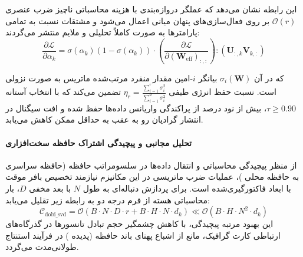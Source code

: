 این رابطه نشان می‌دهد که عملگر دروازه‌بندی با هزینه محاسباتی ناچیز ضرب عنصری $\mathcal{O}(r)$ بر روی فعال‌سازی‌های پنهان میانی اعمال می‌شود و مشتقات نسبت به تمامی پارامترها به صورت کاملاً تحلیلی و ملایم منتشر می‌گردند:
\begin{equation}
\frac{\partial \mathcal{L}}{\partial \alpha_k} = \sigma(\alpha_k)(1 - \sigma(\alpha_k)) \cdot \left( \frac{\partial \mathcal{L}}{\partial (\mathbf{W}_{\text{eff}})_{:, :}} \right) : (\mathbf{U}_{:, k} \mathbf{V}_{k, :})
\end{equation}

که در آن $\sigma_i(\mathbf{W})$ بیانگر $i$-امین مقدار منفرد مرتب‌شده ماتریس به صورت نزولی است. نسبت حفظ انرژی طیفی $\eta_r = \frac{\sum_{i=1}^r \sigma_i^2}{\sum_{i=1}^{d} \sigma_i^2}$ تضمین می‌کند که با انتخاب آستانه $\tau \ge 0.90$، بیش از نود درصد از پراکندگی واریانس داده‌ها حفظ شده و افت سیگنال در انتشار گرادیان رو به عقب به حداقل ممکن کاهش می‌یابد.

\paragraph{تحلیل مجانبی و پیچیدگی اشتراک حافظه سخت‌افزاری}
از منظر پیچیدگی محاسباتی و انتقال داده‌ها در سلسومراتب حافظه (حافظه سراسری  به حافظه محلی )، عملیات ضرب ماتریسی در این مکانیزم نیازمند تخصیص بافر موقت با ابعاد فاکتورگیری‌شده است. برای پردازش دنباله‌ای به طول $N$ با بعد مخفی $D$، بار محاسباتی هسته از فرم درجه دو به رابطه زیر تقلیل می‌یابد:
\begin{equation}
\label{eq:complexity_dobi_svd}
\mathcal{C}_{\text{dobi\_svd}} = \mathcal{O}\left( B \cdot N \cdot D \cdot r + B \cdot H \cdot N \cdot d_k \right) \ll \mathcal{O}\left( B \cdot H \cdot N^2 \cdot d_k \right)
\end{equation}
این بهبود مرتبه پیچیدگی، با کاهش چشمگیر حجم تبادل تانسورها در گذرگاه‌های ارتباطی کارت گرافیک، مانع از اشباع پهنای باند حافظه (پدیده ) در فرآیند استنتاج طولانی‌مدت می‌گردد.
